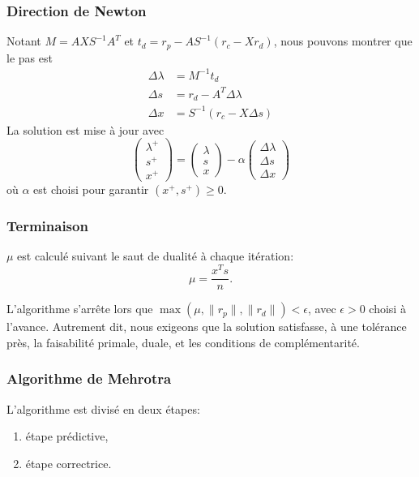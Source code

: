 \documentclass[usepdftitle=false, aspectratio=169]{beamer}
\begin{document}
\begin{frame}
\frametitle{Direction de Newton}

Notant $M = AXS^{-1}A^T$ et $t_d = r_p-AS^{-1}(r_c-Xr_d)$, nous pouvons montrer que le pas est
\begin{align*}
\Delta \lambda &= M^{-1}t_d \\
\Delta s &= r_d - A^{T}\Delta \lambda \\
\Delta x &= S^{-1}(r_c-X \Delta s)
\end{align*}
La solution est mise à jour avec
$$
\begin{pmatrix}
\lambda^+ \\
s^+ \\
x^+
\end{pmatrix}
=
\begin{pmatrix}
	\lambda \\
	s \\
	x
\end{pmatrix}
-
\alpha
\begin{pmatrix}
	\Delta \lambda \\
	\Delta s \\
	\Delta x
\end{pmatrix}
$$
où $\alpha$ est choisi pour garantir $(x^+, s^+) \geq 0$.

\end{frame}

\begin{frame}
\frametitle{Terminaison}

$\mu$ est calculé suivant le saut de dualité à chaque itération:
$$
\mu = \frac{x^Ts}{n}.
$$

\mbox{}

L'algorithme s'arrête lors que $\max(\mu, \|r_p\|, \|r_d\|) < \epsilon$, avec $\epsilon > 0$ choisi à l'avance. Autrement dit, nous exigeons que la solution satisfasse, à une tolérance près, la faisabilité primale, duale, et les conditions de complémentarité.

\end{frame}

\begin{frame}
\frametitle{Algorithme de Mehrotra}

L'algorithme est divisé en deux étapes:
\begin{enumerate}
\item
étape prédictive,
\item
étape correctrice.
\end{enumerate}

\end{frame}
\end{document}
